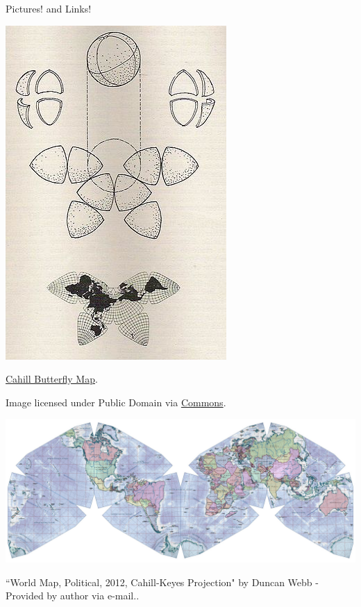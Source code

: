 \documentclass[12pt]{beamer}
\theoremstyle{plain}
\theoremstyle{definition}
\begin{document}
\begin{frame}[allowframebreaks]{\small Pictures! and Links!}
\begin{center}
\includegraphics[scale=0.6]{318px-Cahill_Butterfly_Map}

\href{https://en.wikipedia.org/wiki/Bernard_J._S._Cahill} {Cahill Butterfly Map}. 

Image licensed under Public Domain via \href{https://commons.wikimedia.org/wiki/}{Commons}.
\end{center}
%
\framebreak
\begin{center}
\href{https://en.wikipedia.org/wiki/Cahill-Keyes_projection}{
\includegraphics[scale=0.18]{World_Map,_Political,_2012,_Cahill-Keyes_Projection}
}

``World Map, Political, 2012, Cahill-Keyes Projection" by Duncan Webb - Provided by author via e-mail.. 


\end{center}
\end{frame}
\end{document}
